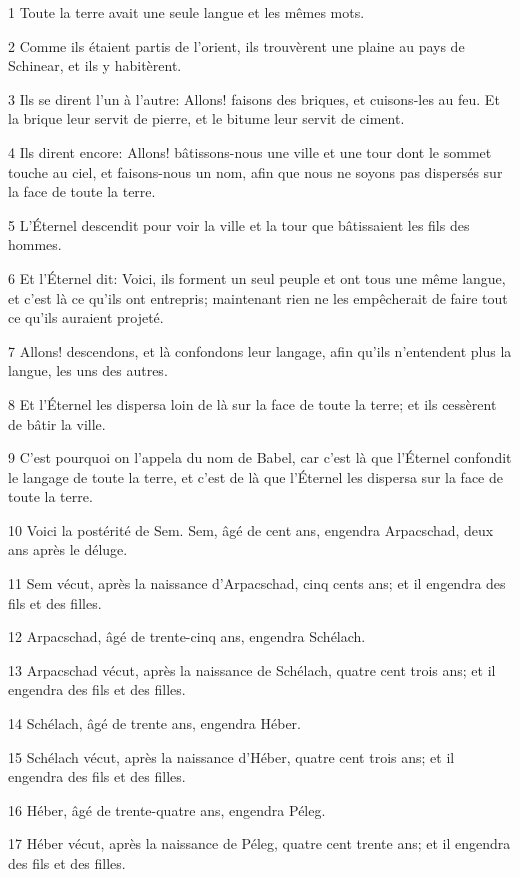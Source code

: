 \par 1 Toute la terre avait une seule langue et les mêmes mots.
\par 2 Comme ils étaient partis de l'orient, ils trouvèrent une plaine au pays de Schinear, et ils y habitèrent.
\par 3 Ils se dirent l'un à l'autre: Allons! faisons des briques, et cuisons-les au feu. Et la brique leur servit de pierre, et le bitume leur servit de ciment.
\par 4 Ils dirent encore: Allons! bâtissons-nous une ville et une tour dont le sommet touche au ciel, et faisons-nous un nom, afin que nous ne soyons pas dispersés sur la face de toute la terre.
\par 5 L'Éternel descendit pour voir la ville et la tour que bâtissaient les fils des hommes.
\par 6 Et l'Éternel dit: Voici, ils forment un seul peuple et ont tous une même langue, et c'est là ce qu'ils ont entrepris; maintenant rien ne les empêcherait de faire tout ce qu'ils auraient projeté.
\par 7 Allons! descendons, et là confondons leur langage, afin qu'ils n'entendent plus la langue, les uns des autres.
\par 8 Et l'Éternel les dispersa loin de là sur la face de toute la terre; et ils cessèrent de bâtir la ville.
\par 9 C'est pourquoi on l'appela du nom de Babel, car c'est là que l'Éternel confondit le langage de toute la terre, et c'est de là que l'Éternel les dispersa sur la face de toute la terre.
\par 10 Voici la postérité de Sem. Sem, âgé de cent ans, engendra Arpacschad, deux ans après le déluge.
\par 11 Sem vécut, après la naissance d'Arpacschad, cinq cents ans; et il engendra des fils et des filles.
\par 12 Arpacschad, âgé de trente-cinq ans, engendra Schélach.
\par 13 Arpacschad vécut, après la naissance de Schélach, quatre cent trois ans; et il engendra des fils et des filles.
\par 14 Schélach, âgé de trente ans, engendra Héber.
\par 15 Schélach vécut, après la naissance d'Héber, quatre cent trois ans; et il engendra des fils et des filles.
\par 16 Héber, âgé de trente-quatre ans, engendra Péleg.
\par 17 Héber vécut, après la naissance de Péleg, quatre cent trente ans; et il engendra des fils et des filles.

